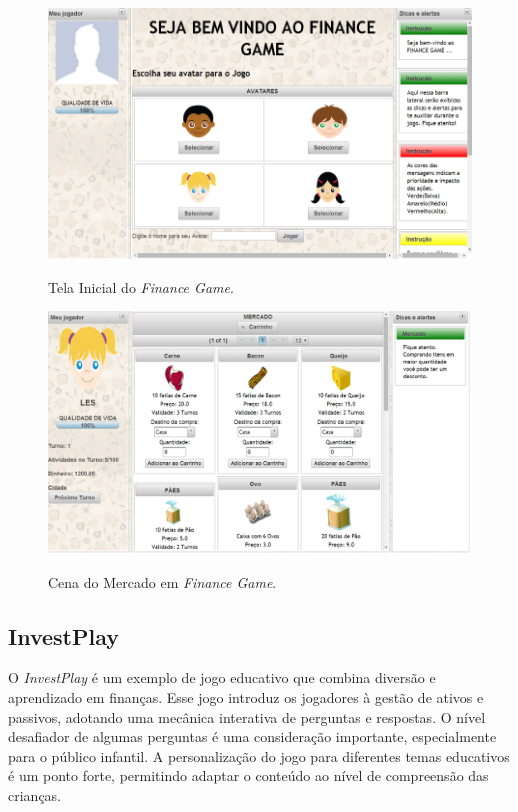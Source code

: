 \begin{figure}[ht]
	\centering
	\caption{Tela Inicial do \textit{Finance Game}.}
	\includegraphics[scale=0.6]{Textuais/Pictures/Finance-game-1.png}
	\label{fig:finance-game-1}
\end{figure}

\begin{figure}[ht]
	\centering
	\caption{Cena do Mercado em \textit{Finance Game}.}
	\includegraphics[scale=0.4]{Textuais/Pictures/Finance-game-2.png}
	\label{fig:finance-game-2}
\end{figure}

\newpage

\subsection{InvestPlay}
O \textit{InvestPlay} \cite{santos2020investplay} é um exemplo de jogo educativo que combina diversão e aprendizado em finanças. Esse jogo introduz os jogadores à gestão de ativos e passivos, adotando uma mecânica interativa de perguntas e respostas. O nível desafiador de algumas perguntas é uma consideração importante, especialmente para o público infantil. A personalização do jogo para diferentes temas educativos é um ponto forte, permitindo adaptar o conteúdo ao nível de compreensão das crianças.

